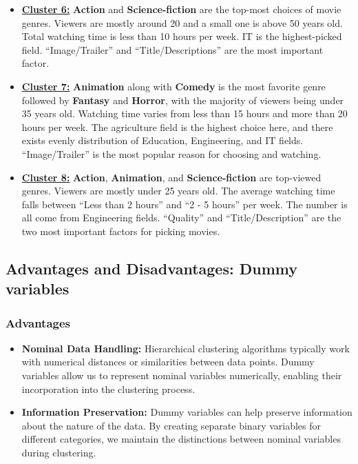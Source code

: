 \begin{itemize}
    \item \textbf{\underline{Cluster 6:}} \textbf{Action} and \textbf{Science-fiction} are the top-most choices of movie genres. Viewers are mostly around 20 and a small one is above 50 years old. Total watching time is less than 10 hours per week. IT is the highest-picked field. “Image/Trailer” and “Title/Descriptions” are the most important factor. 

    \item \textbf{\underline{Cluster 7:}} \textbf{Animation} along with \textbf{Comedy} is the most favorite genre followed by \textbf{Fantasy} and \textbf{Horror}, with the majority of viewers being under 35 years old. Watching time varies from less than 15 hours and more than 20 hours per week. The agriculture field is the highest choice here, and there exists evenly distribution of Education, Engineering, and IT fields. “Image/Trailer” is the most popular reason for choosing and watching.

    \item \textbf{\underline{Cluster 8:}} \textbf{Action}, \textbf{Animation}, and \textbf{Science-fiction} are top-viewed genres. Viewers are mostly under 25 years old. The average watching time falls between “Less than 2 hours” and “2 - 5 hours” per week. The number is all come from Engineering fields. “Quality” and “Title/Description” are the two most important factors for picking movies.
\end{itemize}

\subsection{Advantages and Disadvantages: Dummy variables}

    \subsubsection{Advantages}

        \begin{itemize}
            \item \textbf{Nominal Data Handling:} Hierarchical clustering algorithms typically work with numerical distances or similarities between data points. Dummy variables allow us to represent nominal variables numerically, enabling their incorporation into the clustering process.

            \item \textbf{Information Preservation:} Dummy variables can help preserve information about the nature of the data. By creating separate binary variables for different categories, we maintain the distinctions between nominal variables during clustering.
        \end{itemize}


